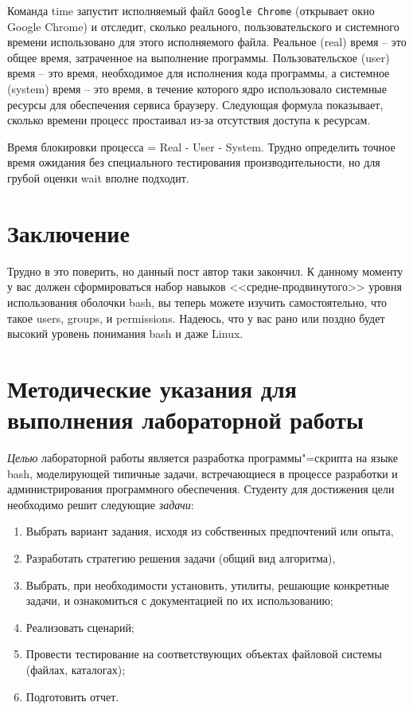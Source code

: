 \documentclass[a4paper,12pt,final,openany]{extbook}
\begin{document}
Команда time запустит  исполняемый файл \texttt{Google Chrome} (открывает окно
Google Chrome) и отследит, сколько реального, пользовательского и
системного времени использовано для этого исполняемого файла.
Реальное (real) время -- это общее время, затраченное на выполнение
программы. Пользовательское (user) время -- это время, необходимое для
исполнения кода программы, а системное (system) время -- это время, в
течение которого ядро использовало системные ресурсы для обеспечения
сервиса браузеру. Следующая формула показывает, сколько времени процесс
простаивал из-за отсутствия доступа к ресурсам.

Время блокировки процесса = Real - User - System.
Трудно определить точное время ожидания без специального тестирования
производительности, но для грубой оценки wait вполне подходит.

\hypertarget{Conclusion}{%
  \chapter*{Заключение}\label{Conclusion}}

Трудно в это поверить, но данный пост автор таки закончил. К данному
моменту у вас должен сформироваться набор навыков <<средне-продвинутого>> уровня использования оболочки bash, вы теперь можете изучить самостоятельно, что такое users, groups, и
permissions. Надеюсь, что у вас рано или поздно будет высокий уровень
понимания bash и даже Linux.

\chapter{Методические указания для выполнения лабораторной работы}

\emph{Целью} лабораторной работы является разработка программы"=скрипта на языке bash, моделирующей типичные задачи, встречающиеся в процессе разработки и администрирования программного обеспечения. Студенту для достижения цели необходимо решит следующие \emph{задачи}:
\begin{enumerate}
\item Выбрать вариант задания, исходя из собственных предпочтений или опыта,
\item Разработать стратегию решения задачи (общий вид алгоритма),
\item Выбрать, при необходимости установить, утилиты, решающие конкретные задачи, и ознакомиться с документацией по их использованию;
\item Реализовать сценарий;
\item Провести тестирование на соответствующих объектах файловой системы (файлах, каталогах);
\item Подготовить отчет.
\end{enumerate}
\end{document}
